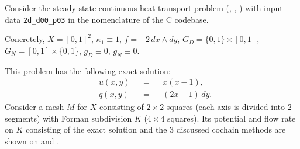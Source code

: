 \begin{example}
  \label{idec/diffusion/continuous/steady_state/examples/2d_d00_p03-example}
  Consider the steady-state continuous heat transport problem
  (,
   ,
   )
  with input data \verb|2d_d00_p03| in the nomenclature of the C codebase.

  Concretely,
    $X = [0, 1]^2$,
    $\kappa_1 \equiv 1$,
    $f = -2 \, d x \wedge d y$,
    $G_D = \{0, 1\} \times [0, 1]$,
    $G_N = [0, 1] \times \{0, 1\}$,
    $g_D \equiv 0$,
    $g_N \equiv 0$.

  This problem has the following exact solution:
  \begin{subequations}
    \begin{alignat}{3}
      & u(x, y) && = && x (x - 1), \\
      & q(x, y) && = && (2 x - 1)\, d y.
    \end{alignat}
  \end{subequations}
  Consider a mesh $M$ for $X$ consisting of $2 \times 2$ squares (each axis is
  divided into $2$ segments) with Forman subdivision $K$ ($4 \times 4$ squares).
  Its potential and flow rate on $K$ consisting of the exact solution and the
  $3$ discussed cochain methods are shown on
  and
  .
\end{example}
